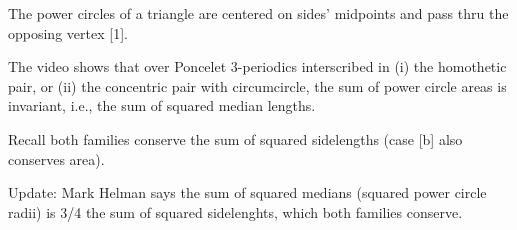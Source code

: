 The power circles of a triangle are centered on sides' midpoints and pass thru the opposing vertex [1].

The video shows that over Poncelet 3-periodics interscribed in (i) the homothetic pair, or (ii) the concentric pair with circumcircle, the sum of power circle areas is invariant, i.e., the sum of squared median lengths.

Recall both families conserve the sum of squared sidelengths (case [b] also conserves area). 

Update: Mark Helman says the sum of squared medians (squared power circle radii) is 3/4 the sum of squared sidelenghts, which both families conserve.